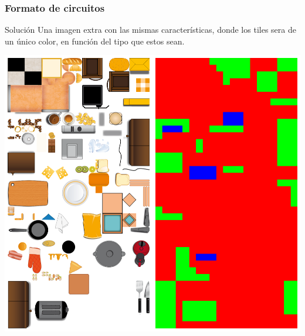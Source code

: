 \begin{frame}
    \frametitle{Formato de circuitos}

        \begin{block}{Solución}
        Una imagen extra con las mismas características, donde los tiles sera de un único color, en función del tipo
        que estos sean.
        \end{block}

        \begin{center}
                \includegraphics[scale=0.15]{imagenes/tileset-collisionmap.png}
        \end{center}
        

\end{frame}

